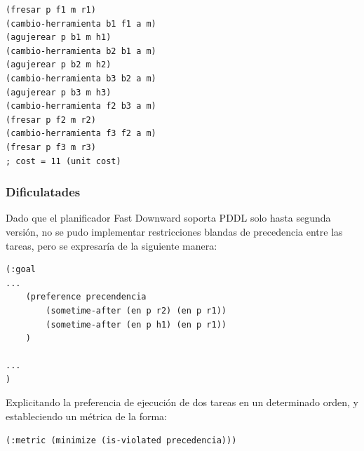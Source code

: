 \documentclass[onecolumn]{article}
\begin{document}
\begin{verbatim}
(fresar p f1 m r1)
(cambio-herramienta b1 f1 a m)
(agujerear p b1 m h1)
(cambio-herramienta b2 b1 a m)
(agujerear p b2 m h2)
(cambio-herramienta b3 b2 a m)
(agujerear p b3 m h3)
(cambio-herramienta f2 b3 a m)
(fresar p f2 m r2)
(cambio-herramienta f3 f2 a m)
(fresar p f3 m r3)
; cost = 11 (unit cost)
\end{verbatim}

\hypertarget{dificulatades}{%
\subsubsection{Dificulatades}\label{dificulatades}}

Dado que el planificador Fast Downward soporta PDDL solo hasta segunda
versión, no se pudo implementar restricciones blandas de precedencia
entre las tareas, pero se expresaría de la siguiente manera:

\begin{verbatim}
(:goal
...
    (preference precendencia
        (sometime-after (en p r2) (en p r1))
        (sometime-after (en p h1) (en p r1))
    )

...
)
\end{verbatim}

Explicitando la preferencia de ejecución de dos tareas en un determinado
orden, y estableciendo un métrica de la forma:

\begin{verbatim}
(:metric (minimize (is-violated precedencia)))
\end{verbatim}
\end{document}
